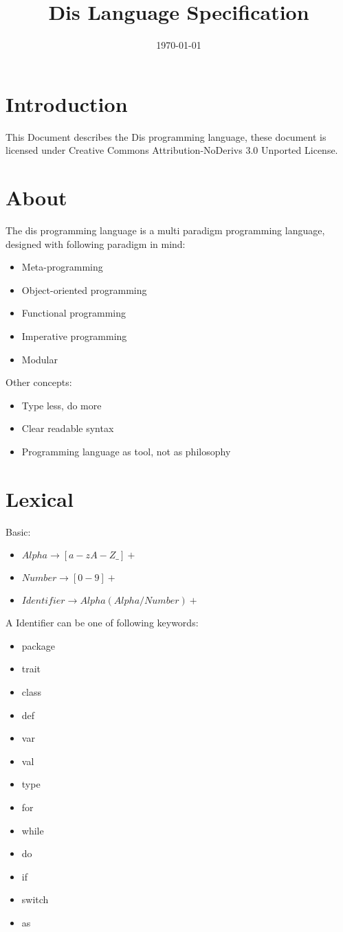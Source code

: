 \documentclass[a4paper]{article}
\title{Dis Language Specification}
\date{\today}
\author{}
\begin{document}
\maketitle
\newpage
\tableofcontents
\newpage

\section{Introduction}
This Document describes the Dis programming language, these document is licensed under Creative Commons Attribution-NoDerivs 3.0 Unported License.

\section{About}
The dis programming language is a multi paradigm programming language, designed with following paradigm in mind:
\begin{itemize}
\item Meta-programming
\item Object-oriented programming
\item Functional programming
\item Imperative programming
\item Modular
\end{itemize}

Other concepts:
\begin{itemize}
\item Type less, do more
\item Clear readable syntax
\item Programming language as tool, not as philosophy
\end{itemize}

\section{Lexical}
Basic:

\begin{itemize}
\item $Alpha \rightarrow [a-zA-Z\_]+$
\item $Number \rightarrow [0-9]+$
\item $Identifier \rightarrow Alpha (Alpha / Number)+$
\end{itemize}

A Identifier can be one of following keywords:
\begin{multicols}{4}
\begin{itemize}
\item package 
\item trait 
\item class 
\item def 
\item var 
\item val 
\item type 
\item for 
\item while 
\item do 
\item if 
\item switch 
\item as
\end{itemize}
\end{multicols}
\end{document}
